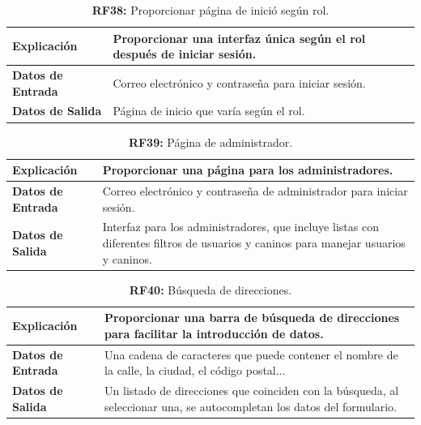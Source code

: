 \documentclass[a4paper, 12pt]{article}
\begin{document}
\begin{table}[H]
\captionsetup{justification=raggedright,singlelinecheck=false}
\caption{\textbf{RF38:} Proporcionar página de inició según rol.}
\label{tab:RF38}
	\begin{tabular}{|m{5cm}|m{10cm}|}
	\hline
	\textbf{Explicación} & Proporcionar una interfaz única según el rol después de iniciar sesión. \\ 
	\hline
	\textbf{Datos de Entrada} & Correo electrónico y contraseña para iniciar sesión. \\ 
	\hline
	\textbf{Datos de Salida} & Página de inicio que varía según el rol. \\ 
	\hline
\end{tabular}
\end{table}

\begin{table}[H]
\captionsetup{justification=raggedright,singlelinecheck=false}
\caption{\textbf{RF39:} Página de administrador.}
\label{tab:RF39}
	\begin{tabular}{|m{5cm}|m{10cm}|}
	\hline
	\textbf{Explicación} & Proporcionar una página para los administradores. \\ 
	\hline
	\textbf{Datos de Entrada} & Correo electrónico y contraseña de administrador para iniciar sesión. \\ 
	\hline
	\textbf{Datos de Salida} & Interfaz para los administradores, que incluye listas con diferentes filtros de usuarios y caninos para manejar usuarios y caninos. \\ 
	\hline
\end{tabular}
\end{table}

\begin{table}[H]
\captionsetup{justification=raggedright,singlelinecheck=false}
\caption{\textbf{RF40:} Búsqueda de direcciones.}
\label{tab:RF40}
	\begin{tabular}{|m{5cm}|m{10cm}|}
	\hline
	\textbf{Explicación} & Proporcionar una barra de búsqueda de direcciones para facilitar la introducción de datos. \\ 
	\hline
	\textbf{Datos de Entrada} & Una cadena de caracteres que puede contener el nombre de la calle, la ciudad, el código postal... \\ 
	\hline
	\textbf{Datos de Salida} & Un listado de direcciones que coinciden con la búsqueda, al seleccionar una, se autocompletan los datos del formulario. \\ 
	\hline
\end{tabular}
\end{table}
\end{document}
